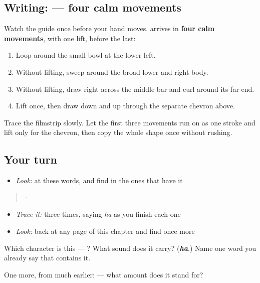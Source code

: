 \subsection*{Writing:  — four calm movements}

Watch the guide once before your hand moves.  arrives in \textbf{four calm movements}, with one lift, before the last:

\begin{enumerate}
\raggedright
  \item Loop around the small bowl at the lower left.
  \item Without lifting, sweep around the broad lower and right body.
  \item Without lifting, draw right across the middle bar and curl around its far end.
  \item Lift once, then draw down and up through the separate chevron above.
\end{enumerate}

Trace the filmstrip slowly. Let the first three movements run on as one stroke and lift only for the chevron, then copy the whole shape once without rushing.

\subsection*{Your turn}
\begin{itemize}
\raggedright
  \item \emph{Look:} at these words, and find  in the ones that have it
\end{itemize}

\begin{quote}
  ·  
\end{quote}

\begin{itemize}
\raggedright
  \item \emph{Trace it:}  three times, saying \emph{ha} as you finish each one
  \item \emph{Look:} back at any page of this chapter and find  once more
\end{itemize}

\begin{tcolorbox}[breakable,colback=teal!4,colframe=teal!35!black,title={Before you move on}]
Which character is this — ? What sound does it carry? (\emph{\textbf{ha}}.) Name one word you already say that contains it.

One more, from much earlier:  — what amount does it stand for?
\end{tcolorbox}
